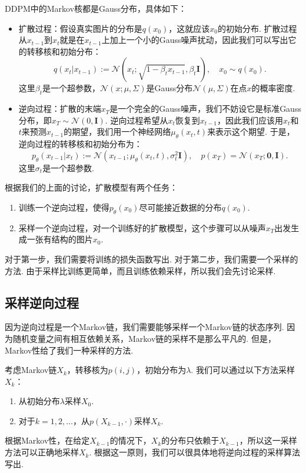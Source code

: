 DDPM中的Markov核都是Gauss分布，具体如下：
\begin{itemize}
    \item 扩散过程：假设真实图片的分布是$q(x_0)$，这就应该$x_0$的初始分布. 扩散过程从$x_{t-1}$到$x_t$就是在$x_{t-1}$上加上一个小的Gauss噪声扰动，因此我们可以写出它的转移核和初始分布：
    \[q(x_t|x_{t-1}) := \mathcal{N}(x_t; \sqrt{1 - \beta_t x_{t-1}}, \beta_t \mathbf{I}),\quad x_0\sim q(x_0).\]
    这里$\beta_t$是一个超参数，$\mathcal{N}(x;\mu,\Sigma)$是Gauss分布$\mathcal{N}(\mu,\Sigma)$在点$x$的概率密度. 
    \item 逆向过程：扩散的末端$x_T$是一个完全的Gauss噪声，我们不妨设它是标准Gauss分布，即$x_T\sim\mathcal{N}(0,\mathbf{I})$. 逆向过程希望从$x_t$恢复到$x_{t-1}$，因此我们应该用$x_t$和$t$来预测$x_{t-1}$的期望，我们用一个神经网络$\mu_\theta(x_t,t)$来表示这个期望. 于是，逆向过程的转移核和初始分布为：
    \[
    p_{\theta}(x_{t-1}|x_t) := \mathcal{N}(x_{t-1}; \mu_{\theta}(x_t, t), \sigma_t^2\mathbf{I}),\quad p(x_T)=\mathcal{N}(x_T;\mathbf{0},\mathbf{I}).
    \]  
    这里$\sigma_t$是一个超参数. 
\end{itemize}

根据我们的上面的讨论，扩散模型有两个任务：

\begin{enumerate}
    \item 训练一个逆向过程，使得$p_\theta(x_0)$尽可能接近数据的分布$q(x_0)$. 
    \item 采样一个逆向过程，对一个训练好的扩散模型，这个步骤可以从噪声$x_T$出发生成一张有结构的图片$x_0$. 
\end{enumerate}

对于第一步，我们需要将训练的损失函数写出. 对于第二步，我们需要一个采样的方法. 由于采样比训练更简单，而且训练依赖采样，所以我们会先讨论采样. 

\subsection{采样逆向过程}

因为逆向过程是一个Markov链，我们需要能够采样一个Markov链的状态序列. 因为随机变量之间有相互依赖关系，Markov链的采样不是那么平凡的. 但是，Markov性给了我们一种采样的方法. 

考虑Markov链$X_k$，转移核为$p(i,j)$，初始分布为$\lambda$. 我们可以通过以下方法采样$X_k$：
\begin{enumerate}
    \item 从初始分布$\lambda$采样$X_0$.
    \item 对于$k=1,2,\dots$，从$p(X_{k-1},\cdot)$采样$X_k$.
\end{enumerate}
根据Markov性，在给定$X_{k-1}$的情况下，$X_k$的分布只依赖于$X_{k-1}$，所以这一采样方法可以正确地采样$X_k$. 根据这一原则，我们可以很具体地将逆向过程的采样算法写出. 

